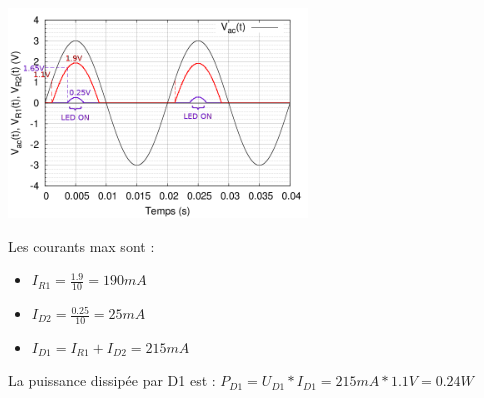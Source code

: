 \documentclass{../template/tp}
\begin{document}
{%
\begin{center} \includegraphics[width=300px]{image2corr.png} \end{center}
Les courants max sont :
\begin{itemize}
    \item $I_{R1} = \frac{1.9}{10} = 190mA$
    \item $I_{D2} = \frac{0.25}{10} = 25mA$
    \item $I_{D1} = I_{R1} + I_{D2} = 215mA$
\end{itemize}
La puissance dissipée par D1 est : $P_{D1} = U_{D1}*I_{D1} = 215mA*1.1V = 0.24W$
}


\end{document}

